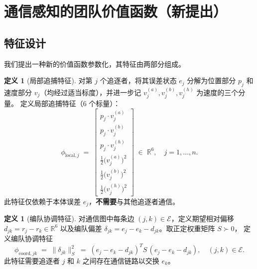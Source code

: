 \documentclass[a4paper,11pt]{article}
\theoremstyle{plain}
\theoremstyle{definition}
\newtheorem{definition}[theorem]{定义}
\theoremstyle{remark}
\newcommand{\R}{\mathbb{R}}
\newcommand{\cE}{\mathcal{E}}
\newcommand{\norm}[1]{\lVert #1 \rVert}
\begin{document}
\section{通信感知的团队价值函数（新提出）}\label{sec:new}

\subsection{特征设计}\label{subsec:features}

我们提出一种新的价值函数参数化，其特征由两部分组成。

\begin{definition}[局部追捕特征]\label{def:local_feat}
  对第 $j$ 个追逐者，将其误差状态 $e_j$ 分解为位置部分 $p_j$
  和速度部分 $v_j$（均经过适当标度），并进一步记
  $v_j^{(a)},v_j^{(b)},v_j^{(h)}$ 为速度的三个分量。
  定义局部追捕特征（$6$ 个标量）：
  \begin{equation}\label{eq:phi_local}
    \phi_{\text{local},j} \;=\;
    \begin{bmatrix}
      p_j \cdot v_j^{(a)} \\[2pt]
      p_j \cdot v_j^{(b)} \\[2pt]
      p_j \cdot v_j^{(h)} \\[4pt]
      \tfrac{1}{2}\bigl(v_j^{(a)}\bigr)^2 \\[2pt]
      \tfrac{1}{2}\bigl(v_j^{(b)}\bigr)^2 \\[2pt]
      \tfrac{1}{2}\bigl(v_j^{(h)}\bigr)^2
    \end{bmatrix}
    \;\in\; \R^6, \quad j = 1,\dots,n.
  \end{equation}
  此特征仅依赖于本体误差 $e_j$，\textbf{不需要}与其他追逐者通信。
\end{definition}

\begin{definition}[编队协调特征]\label{def:coord_feat}
  对通信图中每条边 $(j,k)\in\cE$，定义期望相对偏移
  $d_{jk} = r_j - r_k \in \R^6$ 以及编队偏差
  $\delta_{jk} = e_j - e_k - d_{jk}$。取正定权重矩阵 $S \succ 0$，
  定义编队协调特征
  \begin{equation}\label{eq:phi_coord}
    \phi_{\text{coord},jk}
    \;=\; \norm{\delta_{jk}}_S^2
    \;=\; (e_j - e_k - d_{jk})^T S\, (e_j - e_k - d_{jk}),
    \quad (j,k)\in\cE.
  \end{equation}
  此特征需要追逐者 $j$ 和 $k$ 之间存在通信链路以交换 $e_k$。
\end{definition}
\end{document}
